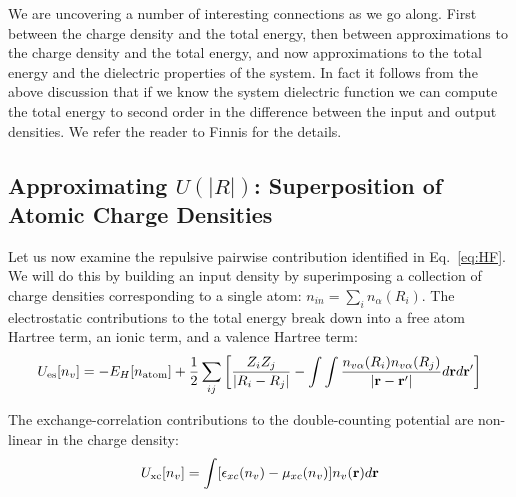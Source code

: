 

We are uncovering a number of interesting connections as we go along. First between the charge density
and the total energy, then between approximations to the charge density and the total energy, and 
now approximations to the total energy and the dielectric properties of the system. In fact
it follows from the above discussion that if we know the system dielectric function we can
compute the total energy to second order in the difference between the input and output densities.
We refer the reader to Finnis for the details.

\subsection{Approximating $U(|R|)$: Superposition of Atomic Charge Densities}
Let us now examine the repulsive pairwise contribution identified in Eq.~\ref{eq:HF}. 
We will do this by building an input density by superimposing a collection of charge densities
corresponding to a single atom: $n_{in} = \sum_{i}n_{\alpha}(R_i)$. The electrostatic
contributions to the total energy break down into a free atom Hartree term, an ionic term, 
and a valence Hartree term:
%
\begin{equation}
\label{eq:esdc}
U_{\rm es}[n_{v}] = -E_{H}[n_{\rm atom}] + \frac{1}{2}\sum_{ij} \left[ \frac{Z_{i}Z_{j}}{|R_{i}-R_{j}|} - \int\int\frac{n_{v\alpha}(R_{i})n_{v\alpha}(R_{j})}{|{\bf r}-{\bf r}'|}d{\bf r} d{\bf r}'\right]
\end{equation}

The exchange-correlation contributions to the double-counting potential are non-linear in the charge density:
%
\begin{equation}
\label{eq:xcdc}
U_{\rm xc}[n_v] = \int[\epsilon_{xc}(n_{v})-\mu_{xc}(n_{v})]n_{v}({\bf r}) d{\bf r} 
\end{equation}
%

